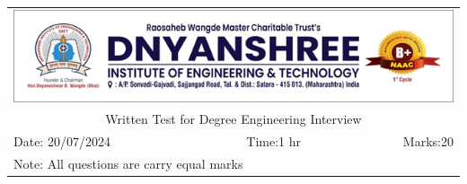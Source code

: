 \documentclass[a4, 12pt, addpoints]{exam}
\begin{document}
\def\arraystretch{1}
\begin{longtable}{lp{}p{}r}
\multicolumn{4}{c}{\includegraphics[width= \textwidth]{dietlogo}} \\ 
\multicolumn{4}{c}{Written Test for Degree Engineering Interview} \\
Date: 20/07/2024 & \multicolumn{2}{c}{Time:1 hr} & Marks:20 \\
\multicolumn{4}{l}{ Note: All questions are carry equal marks} \\ \hline
\end{longtable}
\end{document}
